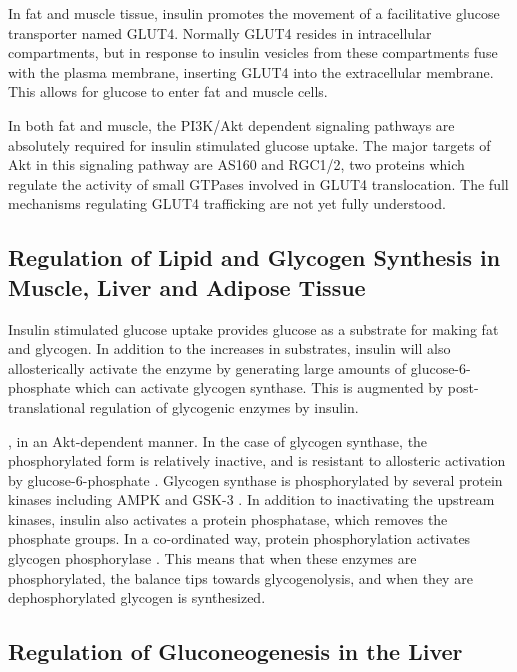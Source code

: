 \documentclass{tufte-handout}
\begin{document}
In fat and muscle tissue, insulin promotes the movement of a facilitative glucose transporter named GLUT4.  Normally GLUT4 resides in intracellular compartments, but in response to insulin vesicles from these compartments fuse with the plasma membrane, inserting GLUT4 into the extracellular membrane.  This allows for glucose to enter fat and muscle cells.

In both fat and muscle, the PI3K/Akt dependent signaling pathways are absolutely required for insulin stimulated glucose uptake.  The major targets of Akt in this signaling pathway are AS160 and RGC1/2, two proteins which regulate the activity of small GTPases involved in GLUT4 translocation.  The full mechanisms regulating GLUT4 trafficking are not yet fully understood.

\subsection{Regulation of Lipid and Glycogen Synthesis in Muscle, Liver and Adipose Tissue}

Insulin stimulated glucose uptake provides glucose as a substrate for making fat and glycogen.  In addition to the increases in substrates, insulin will also allosterically activate the enzyme by generating large amounts of glucose-6-phosphate which can activate glycogen synthase.  This is augmented by post-translational regulation of glycogenic enzymes by insulin.

, in an Akt-dependent manner.  In the case of glycogen synthase, the phosphorylated form is relatively inactive, and is resistant to allosteric activation by glucose-6-phosphate \cite{Friedman1963}.  Glycogen synthase is phosphorylated by several protein kinases including AMPK and GSK-3 \cite{Parker1982}.  In addition to inactivating the upstream kinases, insulin also activates a protein phosphatase, which removes the phosphate groups.  In a co-ordinated way, protein phosphorylation activates glycogen phosphorylase \cite{Krebs1964}.  This means that when these enzymes are phosphorylated, the balance tips towards glycogenolysis, and when they are dephosphorylated glycogen is synthesized.

\subsection{Regulation of Gluconeogenesis in the Liver}
\end{document}
